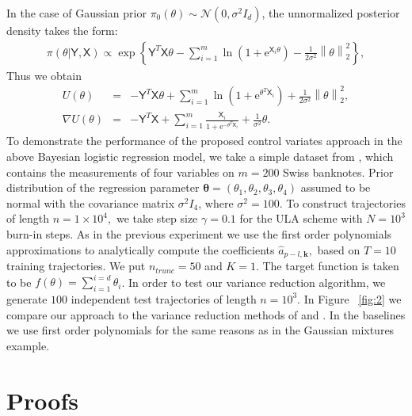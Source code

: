 \documentclass[bj]{imsart}
\def\rme{\mathrm{e}}
\begin{document}
In the case of  Gaussian prior $\pi_0(\theta) \sim \mathcal{N}(0,\sigma^2 I_d)$, the unnormalized posterior density takes the form:
\begin{eqnarray*}
\pi(\theta | \mathsf{Y}, \mathsf{X}) \propto \exp \left\{ \mathsf{Y}^T \mathsf{X} \theta - \sum\limits_{i=1}^m \ln{\left(1 + \rme^{\mathsf{X}_i \theta}\right)} - \frac{1}{2\sigma^2} \left\|\theta\right\|_2^2 \right\},
\end{eqnarray*}
Thus we obtain
\begin{eqnarray*}
U(\theta) &=& -\mathsf{Y}^T \mathsf{X} \theta + \sum_{i=1}^m \ln{\left(1 + \rme^{\theta^T \mathsf{X}_i}\right)} + \frac{1}{2\sigma^2} \left\| \theta\right\|_2^2,
\\
\nabla U(\theta) &=& -\mathsf{Y}^T \mathsf{X} + \sum_{i=1}^m \frac{\mathsf{X}_i}{1 + \rme^{-\mathsf{\theta}^T \mathsf{X}_i}} + \frac{1}{\sigma^2} \theta.
\end{eqnarray*}
To demonstrate the performance of the proposed control variates approach in the above Bayesian logistic regression model, we take a simple dataset from \cite{mira2013zero}, which contains the measurements of four variables on $m=200$ Swiss banknotes. Prior distribution of the regression parameter $\mathbf{\theta} = \left( \theta_1, \theta_2, \theta_3, \theta_4 \right)$ assumed to be normal with the covariance matrix $\sigma^2 I_4$, where $\sigma^2 = 100$. To construct trajectories of length $n = 1 \times 10^4, $ we take step size $\gamma = 0.1$ for the ULA scheme with $N = 10^3$ burn-in steps. As in the previous experiment we use the first order polynomials approximations to analytically compute the coefficients $\hat{a}_{p-l,\mathbf{k}},$ based on $T = 10$ training trajectories. We put $n_{trunc} = 50$ and $K = 1$. The target function is taken to be $f(\theta) = \sum_{i=1}^{i=d}\theta_i$.  In order to test our variance reduction algorithm, we generate \(100\) independent test trajectories of length $n = 10^3$. In Figure ~\ref{fig:2} we compare our approach to the variance reduction methods of \cite{mira2013zero} and \cite{belomestny2019esvm}. In the baselines we use first order polynomials for the same reasons as in the Gaussian mixtures example.

\section{Proofs}
\label{sec:proofs}
\end{document}
